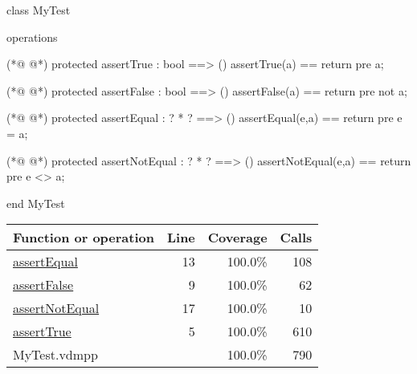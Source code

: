 \begin{vdmpp}[breaklines=true]
class MyTest

operations

(*@
\label{assertTrue:5}
@*)
 protected assertTrue : bool ==> ()
  assertTrue(a) == return
  pre a;
 
(*@
\label{assertFalse:9}
@*)
 protected assertFalse : bool ==> ()
  assertFalse(a) == return
  pre not a;
 
(*@
\label{assertEqual:13}
@*)
 protected assertEqual : ? * ? ==> ()
 assertEqual(e,a) == return
 pre e = a;
 
(*@
\label{assertNotEqual:17}
@*)
 protected assertNotEqual : ? * ? ==> ()
 assertNotEqual(e,a) == return
 pre e <> a;

end MyTest
\end{vdmpp}
\bigskip
\begin{longtable}{|l|r|r|r|}
\hline
Function or operation & Line & Coverage & Calls \\
\hline
\hline
\hyperref[assertEqual:13]{assertEqual} & 13&100.0\% & 108 \\
\hline
\hyperref[assertFalse:9]{assertFalse} & 9&100.0\% & 62 \\
\hline
\hyperref[assertNotEqual:17]{assertNotEqual} & 17&100.0\% & 10 \\
\hline
\hyperref[assertTrue:5]{assertTrue} & 5&100.0\% & 610 \\
\hline
\hline
MyTest.vdmpp & & 100.0\% & 790 \\
\hline
\end{longtable}

